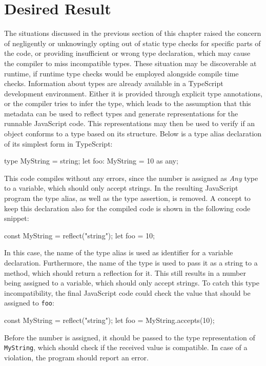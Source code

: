 

\section{Desired Result}
\label{sec:desired-result}

The situations discussed in the previous section of this chapter raised the concern of negligently or unknowingly opting out of static type checks for specific parts of the code, or providing insufficient or wrong type declaration, which may cause the compiler to miss incompatible types. These situation may be discoverable at runtime, if runtime type checks would be employed alongside compile time checks. Information about types are already available in a TypeScript development environment. Either it is provided through explicit type annotations, or the compiler tries to infer the type, which leads to the assumption that this metadata can be used to reflect types and generate representations for the runnable JavaScript code. This representations may then be used to verify if an object conforms to a type based on its structure. Below is a type alias declaration of its simplest form in TypeScript:
\begin{JsCode}[numbers=none]
type MyString = string;
let foo: MyString = 10 as any;
\end{JsCode}
This code compiles without any errors, since the number is assigned as \emph{Any} type to a variable, which should only accept strings. In the resulting JavaScript program the type alias, as well as the type assertion, is removed. A concept to keep this declaration also for the compiled code is shown in the following code snippet:
\begin{JsCode}[numbers=none]
const MyString = reflect("string");
let foo = 10;
\end{JsCode}
In this case, the name of the type alias is used as identifier for a variable declaration. Furthermore, the name of the type is used to pass it as a string to a method, which should return a reflection for it. This still results in a number being assigned to a variable, which should only accept strings. To catch this type incompatibility, the final JavaScript code could check the value that should be assigned to \texttt{foo}:
\begin{JsCode}[numbers=none]
const MyString = reflect("string");
let foo = MyString.accepts(10);
\end{JsCode}
Before the number is assigned, it should be passed to the type representation of \texttt{MyString}, which should check if the received value is compatible. In case of a violation, the program should report an error.

